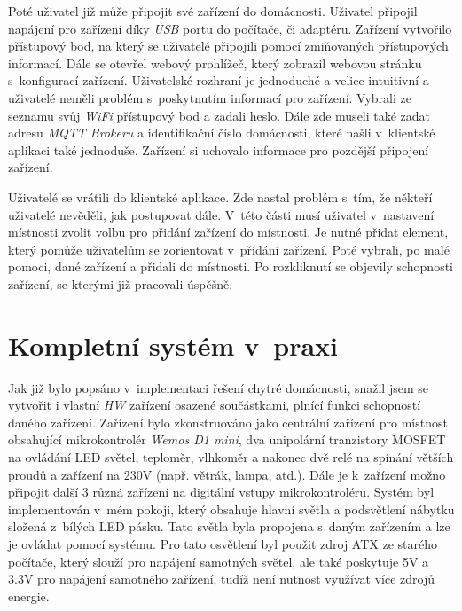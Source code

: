 Poté uživatel již může připojit své zařízení do domácnosti.
Uživatel připojil napájení pro zařízení díky \emph{USB} portu do počítače, či adaptéru.
Zařízení vytvořilo přístupový bod, na který se uživatelé připojili pomocí zmiňovaných přístupových informací.
Dále se otevřel webový prohlížeč, který zobrazil webovou stránku s~konfigurací zařízení.
Uživatelské rozhraní je jednoduché a velice intuitivní a uživatelé neměli problém s~poskytnutím informací pro zařízení.
Vybrali ze seznamu svůj \emph{WiFi} přístupový bod a zadali heslo.
Dále zde museli také zadat adresu \emph{MQTT Brokeru} a identifikační číslo domácnosti, které našli v~klientské aplikaci také jednoduše.
Zařízení si uchovalo informace pro pozdější připojení zařízení.

Uživatelé se vrátili do klientské aplikace.
Zde nastal problém s~tím, že někteří uživatelé nevěděli, jak postupovat dále.
V~této části musí uživatel v~nastavení místnosti zvolit volbu pro přidání zařízení do místnosti.
Je nutné přidat element, který pomůže uživatelům se zorientovat v~přidání zařízení.
Poté vybrali, po malé pomoci, dané zařízení a přidali do místnosti.
Po rozkliknutí se objevily schopnosti zařízení, se kterými již pracovali úspěšně.

\section{Kompletní systém v~praxi}
\label{testovani:praxe}
Jak již bylo popsáno v~implementaci řešení chytré domácnosti, snažil jsem se vytvořit i vlastní \emph{HW} zařízení osazené součástkami, plnící funkci schopností daného zařízení.
Zařízení bylo zkonstruováno jako centrální zařízení pro místnost obsahující mikrokontrolér \emph{Wemos D1 mini}, dva unipolární tranzistory MOSFET na ovládání LED světel, teploměr, vlhkoměr a nakonec dvě relé na spínání větších proudů a zařízení na 230V (např. větrák, lampa, atd.).
Dále je k~zařízení možno připojit další 3 různá zařízení na digitální vstupy mikrokontroléru.
Systém byl implementován v~mém pokoji, který obsahuje hlavní světla a podsvětlení nábytku složená z~bílých LED pásku.
Tato světla byla propojena s~daným zařízením a lze je ovládat pomocí systému.
Pro tato osvětlení byl použit zdroj ATX ze starého počítače, který slouží pro napájení samotných světel, ale také poskytuje 5V a 3.3V pro napájení samotného zařízení, tudíž není nutnost využívat více zdrojů energie.

